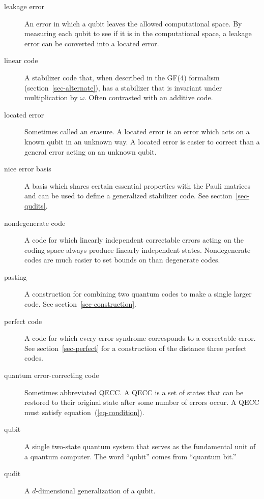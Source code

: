\begin{description}
	\item[leakage error] An error in which a qubit leaves the allowed computational
	space.  By measuring each qubit to see if it is in the computational space,
	a leakage error can be converted into a located error.

	\item[linear code] A stabilizer code that, when described in the GF(4)
	formalism (section~\ref{sec-alternate}), has a stabilizer that is invariant
	under multiplication by $\omega$.  Often contrasted with an additive code.

	\item[located error] Sometimes called an erasure.  A located error is an
	error which acts on a known qubit in an unknown way.  A located error is
	easier to correct than a general error acting on an unknown qubit.

	\item[nice error basis] A basis which shares certain essential properties
	with the Pauli matrices and can be used to define a generalized stabilizer
	code.  See section~\ref{sec-qudits}.

	\item[nondegenerate code] A code for which linearly independent correctable
	errors acting on the coding space always produce linearly independent states.
	Nondegenerate codes are much easier to set bounds on than degenerate codes.

	\item[pasting] A construction for combining two quantum codes to make a
	single larger code.  See section~\ref{sec-construction}.

	\item[perfect code] A code for which every error syndrome corresponds to a
	correctable error.  See section~\ref{sec-perfect} for a construction of
	the distance three perfect codes.

	\item[quantum error-correcting code] Sometimes abbreviated QECC.  A QECC
	is a set of states that can be restored to their original state after some
	number of errors occur.  A QECC must satisfy equation~(\ref{eq-condition}).

	\item[qubit] A single two-state quantum system that serves as the fundamental
	unit of a quantum computer.  The word ``qubit'' comes from ``quantum bit.''

	\item[qudit] A $d$-dimensional generalization of a qubit.


\end{description}
